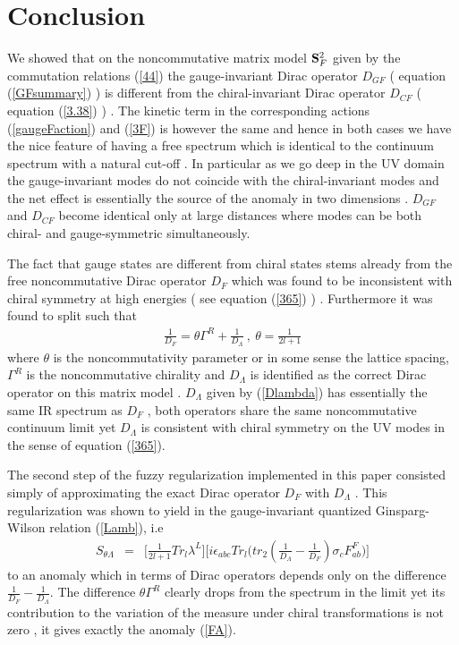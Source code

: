 \documentclass[a4paper,10pt]{article}
\begin{document}
\section{Conclusion}
We showed that on the noncommutative matrix model ${\bf S}^2_F$
given by the commutation relations (\ref{44}) the gauge-invariant
Dirac operator $D_{GF}$ ( equation (\ref{GFsummary}) ) is
different from the chiral-invariant Dirac operator $D_{CF}$ (
equation (\ref{3.38}) ) . The kinetic term in the corresponding
actions (\ref{gaugeFaction}) and (\ref{3F}) is however the same
and hence in both cases we have the nice feature of having a free
spectrum which is identical to the continuum spectrum with a
natural cut-off . In particular as we go deep in the UV domain the
gauge-invariant modes do not coincide with the chiral-invariant
modes and the net effect is essentially the source of the anomaly
in two dimensions . $D_{GF}$ and $D_{CF}$ become identical only
at large distances where modes can be both chiral- and
gauge-symmetric simultaneously.

The fact that gauge states are different from chiral states stems
already from the free noncommutative Dirac operator $D_F$ which
was found to be inconsistent with chiral symmetry at high
energies ( see equation (\ref{365}) ) . Furthermore it was found
to split such that
\begin{eqnarray}
\frac{1}{D_F}={\theta}{\Gamma}^R+\frac{1}{D_{\Lambda}}~,~\theta=\frac{1}{2l+1}\nonumber
\end{eqnarray}
where $\theta$ is the noncommutativity parameter or in some sense
the lattice spacing, ${\Gamma}^R$ is the noncommutative chirality
and $D_{\Lambda}$ is identified as the correct Dirac operator on
this matrix model . $D_{\Lambda}$ given by (\ref{Dlambda}) has
essentially the same IR spectrum as $D_{F}$ , both operators
share the same noncommutative continuum limit yet $D_{\Lambda}$
is consistent with chiral symmetry on the UV modes in the sense
of equation (\ref{365}).

The second step of the fuzzy regularization implemented in this
paper consisted simply of approximating the exact Dirac operator
$D_F$ with $D_{\Lambda}$ . This regularization was shown to yield
in the gauge-invariant quantized Ginsparg-Wilson relation
(\ref{Lamb}), i.e
\begin{eqnarray}
S_{\theta \Lambda}
&=&\bigg[\frac{1}{2l+1}Tr_l{\lambda}^{L}\bigg]\bigg[i{\epsilon}_{abc}Tr_{l}\bigg(tr_2(\frac{1}{D_{\Lambda}}-\frac{1}{D_{F}}){\sigma}_cF_{ab}^F\bigg)\bigg]
\end{eqnarray}
to an anomaly which in terms of Dirac operators depends only on
the difference $\frac{1}{D_F}-\frac{1}{D_{\Lambda}}$. The
difference ${\theta}{\Gamma}^R$ clearly drops from the spectrum
in the limit yet its contribution to the variation of the measure
under chiral transformations is not zero , it gives exactly the
anomaly (\ref{FA}).
\end{document}
